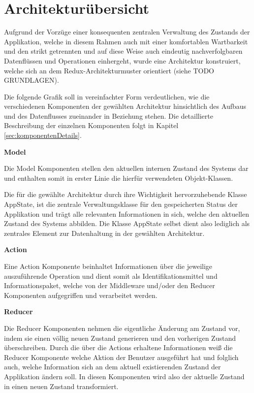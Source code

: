 \documentclass[bibliography=totoc,listof=totoc,BCOR=5mm,DIV=12,oneside]{scrbook}
\begin{document}
\section{Architekturübersicht}
\par Aufgrund der Vorzüge einer konsequenten zentralen Verwaltung des Zustands der Applikation, welche in diesem Rahmen auch mit einer komfortablen Wartbarkeit und den strikt getrennten und auf diese Weise auch eindeutig nachverfolgbaren Datenflüssen und Operationen einhergeht, wurde eine Architektur konstruiert, welche sich an dem Redux-Architekturmuster orientiert (siehe TODO GRUNDLAGEN). 
\par Die folgende Grafik soll in vereinfachter Form verdeutlichen, wie die verschiedenen Komponenten der gewählten Architektur hinsichtlich des Aufbaus und des Datenflusses zueinander in Beziehung stehen. Die detaillierte Beschreibung der einzelnen Komponenten folgt in Kapitel \ref{sec:komponentenDetails}.

\par \bigskip \textbf{Model}
\par Die Model Komponenten stellen den aktuellen internen Zustand des Systems dar und enthalten somit in erster Linie die hierfür verwendeten Objekt-Klassen.
\par Die für die gewählte Architektur durch ihre Wichtigkeit hervorzuhebende Klasse AppState, ist die zentrale Verwaltungsklasse für den gespeicherten Status der Applikation und trägt alle relevanten Informationen in sich, welche den aktuellen Zustand des Systems abbilden. Die Klasse AppState selbst dient also lediglich als zentrales Element zur Datenhaltung in der gewählten Architektur.

\par \bigskip \textbf{Action}
\par Eine Action Komponente beinhaltet Informationen über die jeweilige auszuführende Operation und dient somit als Identifikationsmittel und Informationspaket, welche von der Middleware und/oder den Reducer Komponenten aufgegriffen und verarbeitet werden.

\par \bigskip \textbf{Reducer}
\par Die Reducer Komponenten nehmen die eigentliche Änderung am Zustand vor, indem sie einen völlig neuen Zustand generieren und den vorherigen Zustand überschreiben. Durch die über die Actions erhaltene Informationen weiß die Reducer Komponente welche Aktion der Benutzer ausgeführt hat und folglich auch, welche Information sich an dem aktuell existierenden Zustand der Applikation ändern soll. In diesen Komponenten wird also der aktuelle Zustand in einen neuen Zustand transformiert.
\end{document}
